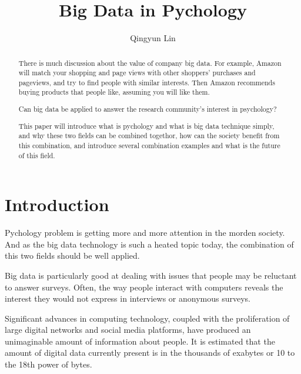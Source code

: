 
\title{Big Data in Pychology}


\author{Qingyun Lin}


\renewcommand{\shortauthors}{G. v. Laszewski}


\begin{abstract}
There is much discussion about the value of company big data. 
For example, Amazon will match your shopping and page views with 
other shoppers’ purchases and pageviews, and try to find people with 
similar interests. Then Amazon recommends buying products that people 
like, assuming you will like them.

Can big data be applied to answer the research community’s interest 
in psychology?

This paper will introduce what is pychology and what is big data 
technique simply, and why these two fields can be combined togethor, 
how can the society benefit from this combination, and introduce 
several combination examples and what is the future of this field.
\end{abstract}



\maketitle

\section{Introduction}

Pychology problem is getting more and more attention in the morden 
society. And as the big data technology is such a heated topic today, 
the combination of this two fields should be well applied.

Big data is particularly good at dealing with issues that people may 
be reluctant to answer surveys. Often, the way people interact with 
computers reveals the interest they would not express in interviews 
or anonymous surveys\cite{editor00}.

Significant advances in computing technology, coupled with the 
proliferation of large digital networks and social media platforms, 
have produced an unimaginable amount of information about people. 
It is estimated that the amount of digital data currently present is 
in the thousands of exabytes or 10 to the 18th power of bytes.

